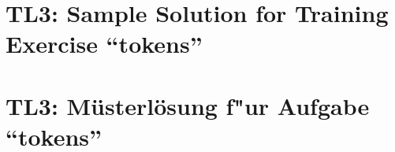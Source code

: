 
\ifenglish
\section*{TL3: Sample Solution for Training Exercise ``tokens''}

\fi
\ifgerman
\section*{TL3: M\"usterl\"osung f"ur Aufgabe ``tokens''}

\fi

